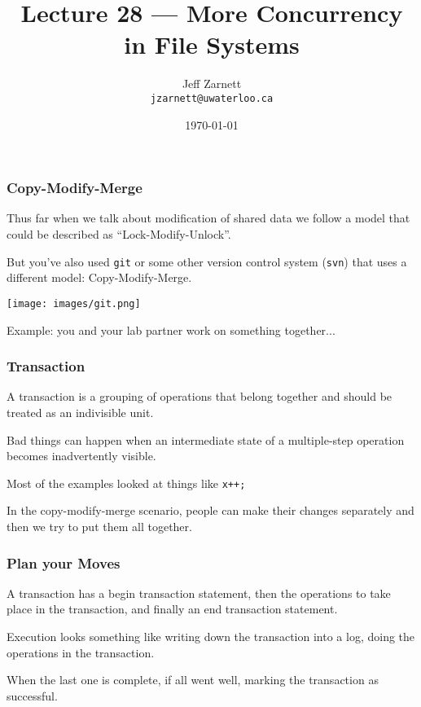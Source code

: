 

\title{Lecture 28 --- More Concurrency in File Systems }

\author{Jeff Zarnett \\ \small \texttt{jzarnett@uwaterloo.ca}}
\date{\today}




\begin{frame}
	\titlepage

\end{frame}


\begin{frame}
	\frametitle{Copy-Modify-Merge}

	Thus far when we talk about modification of shared data we follow a model that could be described as ``Lock-Modify-Unlock''.

	But you've also used \texttt{git} or some other version control system (\texttt{svn}) that uses a different model: Copy-Modify-Merge.

	\begin{center}
		\texttt{[image: images/git.png]}
	\end{center}

	Example: you and your lab partner work on something together...

\end{frame}


\begin{frame}
	\frametitle{Transaction}

	A \alert{transaction} is a grouping of operations that belong together and should be treated as an indivisible unit.

	Bad things can happen when an intermediate state of a multiple-step operation becomes inadvertently visible.

	Most of the examples looked at things like \texttt{x++;}

	In the copy-modify-merge scenario, people can make their changes separately and then we try to put them all together.

\end{frame}

\begin{frame}
	\frametitle{Plan your Moves}

	A transaction has a begin transaction statement, then the operations to take place in the transaction, and finally an end transaction statement.

	Execution looks something like writing down the transaction into a log, doing the operations in the transaction.

	When the last one is complete, if all went well, marking the transaction as successful.

\end{frame}



